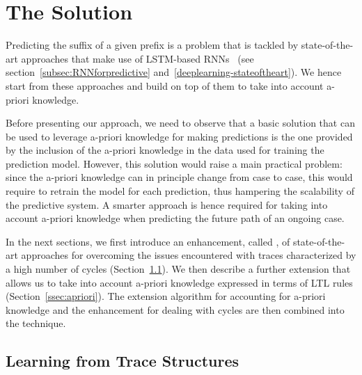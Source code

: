 
\section{The Solution} %
\label{sec:our_approach}

Predicting
the suffix of a given prefix is a problem that is tackled by state-of-the-art approaches that make use of LSTM-based RNNs~\cite{evermann,niek96732} (see section~\ref{subsec:RNNforpredictive} and~\ref{deeplearning-stateoftheart}).  We hence start from these approaches and build on top of them to take into account a-priori knowledge.


Before presenting our approach, we need to observe that a basic solution that can be used to leverage a-priori knowledge for making predictions is the one provided by the inclusion of the a-priori knowledge in the data used for training the prediction model.
However, this solution would raise a main practical problem: since the a-priori knowledge can in principle change from case to case, this would require to retrain the model for each prediction, thus hampering the scalability of the predictive system. A smarter approach is hence required for taking into account a-priori knowledge when predicting the future path of an ongoing case.

In the next sections, we first introduce an enhancement, called \nocycle, of state-of-the-art approaches for overcoming the issues encountered with traces characterized by a high number of cycles (Section~\ref{ssec:noloop}). We then describe a further extension that allows us to take into account a-priori knowledge expressed in terms of LTL rules (Section~\ref{ssec:apriori}). The extension algorithm for accounting for a-priori knowledge and the enhancement for dealing with cycles are then combined into the \protrack technique.

\subsection{Learning from Trace Structures}
\label{ssec:noloop}

